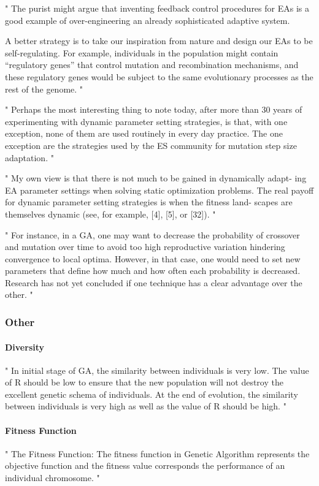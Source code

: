 "
The purist might argue that inventing feedback control procedures for EAs is a good example of over-engineering an already sophisticated adaptive system.

A better strategy is to take our inspiration from nature and design our EAs to be self-regulating. For example, individuals in the population might contain “regulatory genes” that control mutation and recombination mechanisms, and these regulatory genes would be subject to the same evolutionary processes as the rest of the genome.
"\cite{kacprzyk_parameter_2007}

"
Perhaps the most interesting thing to note today, after more than 30 years of experimenting with dynamic parameter setting strategies, is that, with one exception, none of them are used routinely in every day practice. The one exception are the strategies used by the ES community for mutation step size adaptation.
"\cite{kacprzyk_parameter_2007}

"
My own view is that there is not much to be gained in dynamically adapt- ing EA parameter settings when solving static optimization problems. The real payoff for dynamic parameter setting strategies is when the fitness land- scapes are themselves dynamic (see, for example, [4], [5], or [32]).
"\cite{kacprzyk_parameter_2007}

"
For instance, in a GA, one may want to decrease the probability of crossover and mutation over time to avoid too high reproductive variation hindering convergence to local optima. However, in that case, one would need to set new parameters that define how much and how often each probability is decreased. Research has not yet concluded if one technique has a clear advantage over the other.
"\cite{klampfl_using_nodate}

\subsubsection{Other}
\paragraph{Diversity}
"
In initial stage of GA, the similarity between individuals is very low. The value of R should be low to ensure that the new population will not destroy the excellent genetic schema of individuals. At the end of evolution, the similarity between individuals is very high as well as the value of R should be high.
"\cite{katoch_review_2021}


\paragraph{Fitness Function}
"
The Fitness Function: The fitness function in Genetic Algorithm represents the objective function and the fitness value corresponds the performance of an individual chromosome.
"\cite{majumdar_genetic_2015}


